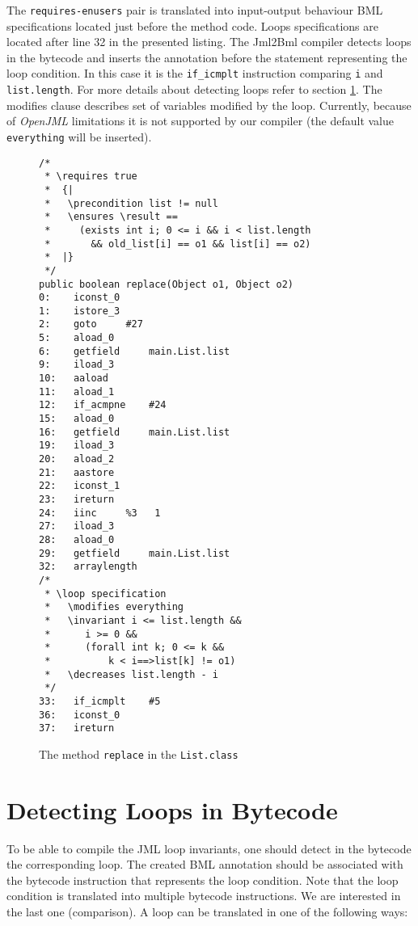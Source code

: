 \documentclass{acm_proc_article-sp}
\begin{document}
The \texttt{requires-enusers} pair is translated into input-output behaviour BML specifications located just before the method code. Loops specifications are located after line 32 in the presented listing. The Jml2Bml compiler detects loops in the bytecode and inserts the annotation before the statement representing the loop condition. In this case it is the \texttt{if\_icmplt} instruction comparing \texttt{i} and \texttt{list.length}. For more details about detecting loops refer to section \ref{loopDetection}. The modifies clause describes set of variables modified by the loop. Currently, because of \textit{OpenJML} limitations it is not supported by our compiler (the default value \texttt{everything} will be inserted).
\begin{figure}
\lstset{basicstyle=\small}

\begin{lstlisting}
/*
 * \requires true
 *  {|
 *   \precondition list != null
 *   \ensures \result ==
 *     (exists int i; 0 <= i && i < list.length
 *       && old_list[i] == o1 && list[i] == o2)
 *  |}
 */
public boolean replace(Object o1, Object o2)
0:    iconst_0
1:    istore_3
2:    goto	   #27
5:    aload_0
6:    getfield	   main.List.list
9:    iload_3
10:   aaload
11:   aload_1
12:   if_acmpne	   #24
15:   aload_0
16:   getfield	   main.List.list
19:   iload_3
20:   aload_2
21:   aastore
22:   iconst_1
23:   ireturn
24:   iinc	   %3	1
27:   iload_3
28:   aload_0
29:   getfield	   main.List.list
32:   arraylength
/*
 * \loop specification
 *   \modifies everything
 *   \invariant i <= list.length &&
 *      i >= 0 &&
 *      (forall int k; 0 <= k &&
 *          k < i==>list[k] != o1)
 *   \decreases list.length - i
 */
33:   if_icmplt	   #5
36:   iconst_0
37:   ireturn

\end{lstlisting}
\label{bytecode}
\caption{The method \texttt{replace} in the \texttt{List.class}}
\end{figure}


\section{Detecting Loops in Bytecode}\label{loopDetection}
To be able to compile the JML loop invariants, one should detect in the bytecode the corresponding loop. The created BML annotation should be associated with the bytecode instruction that represents the loop condition. Note that the loop condition is translated into multiple bytecode instructions. We are interested in the last one (comparison). A loop can be translated in one of the following ways:
\end{document}
